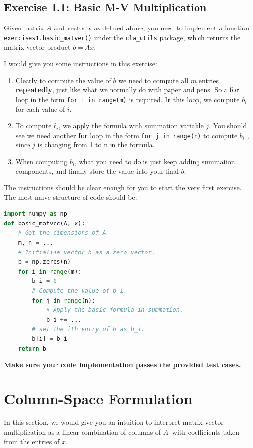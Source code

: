 \subsection*{Exercise 1.1: Basic M-V Multiplication}
\begin{problem}
  Given matrix $A$ and vector $x$ as defined above, you need to implement a function \href{https://comp-lin-alg.github.io/cla_utils.html#cla_utils.exercises1.basic_matvec}{\texttt{exercises1.basic\_matvec()}}
under the \texttt{cla\_utils} package, which returns the matrix-vector product $b = Ax$.
\end{problem}
\noindent I would give you some instructions in this exercise:
\begin{enumerate}
  \item Clearly to compute the value of \(b\)  we need to compute all \(m\)  entries \textbf{repeatedly}, just like what we normally do with paper and pens. So a \textbf{for} loop in the form \texttt{for i in range(m)} is required. In this loop, we compute \(b_i\) for each value of \(i\).
  \item To compute \(b_i\), we apply the formula with summation variable \(j\). You should see we need another \textbf{for} loop in the form \texttt{for j in range(n)} to compute \(b_i\)  , since \(j\) is changing from 1 to n in the formula. 
  \item When computing \(b_i\), what you need to do is just keep adding summation components, and finally store the value into your final \(b\). \checked
\end{enumerate}
The instructions should be clear enough for you to start the very first exercise. The most naive structure of code should be:
\begin{lstlisting}[language=Python]
import numpy as np
def basic_matvec(A, x):
    # Get the dimensions of A
    m, n = ...
    # Initialise vector b as a zero vector.
    b = np.zeros(n)
    for i in range(m):
        b_i = 0
        # Compute the value of b_i.
        for j in range(n):
            # Apply the basic formula in summation.
            b_i += ...
        # set the ith entry of b as b_i.
        b[i] = b_i
    return b
\end{lstlisting}
\textbf{Make sure your code implementation passes the provided test cases.}
\section{Column-Space Formulation}
\label{sec1.2}
In this section, we would give you an intuition to interpret matrix-vector multiplication as a linear combination of columns of $A$, with coefficients taken from the entries of $x$.
